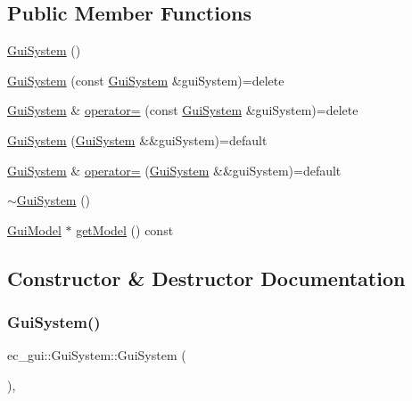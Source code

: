 \subsection*{Public Member Functions}
\begin{DoxyCompactItemize}
\item 
\mbox{\hyperlink{classec__gui_1_1_gui_system_a262982ada03e0085a9932279cf1da678}{Gui\+System}} ()
\item 
\mbox{\hyperlink{classec__gui_1_1_gui_system_aa7b5ff21faa1f3d2d1028e989a0ae937}{Gui\+System}} (const \mbox{\hyperlink{classec__gui_1_1_gui_system}{Gui\+System}} \&gui\+System)=delete
\item 
\mbox{\hyperlink{classec__gui_1_1_gui_system}{Gui\+System}} \& \mbox{\hyperlink{classec__gui_1_1_gui_system_a2ffbc153d2f83db5d6433f148ea69682}{operator=}} (const \mbox{\hyperlink{classec__gui_1_1_gui_system}{Gui\+System}} \&gui\+System)=delete
\item 
\mbox{\hyperlink{classec__gui_1_1_gui_system_aa2d8be80a1eeebb711a25e74840560ef}{Gui\+System}} (\mbox{\hyperlink{classec__gui_1_1_gui_system}{Gui\+System}} \&\&gui\+System)=default
\item 
\mbox{\hyperlink{classec__gui_1_1_gui_system}{Gui\+System}} \& \mbox{\hyperlink{classec__gui_1_1_gui_system_a87323faa2aaad5b224bf4981c9e90101}{operator=}} (\mbox{\hyperlink{classec__gui_1_1_gui_system}{Gui\+System}} \&\&gui\+System)=default
\item 
\mbox{\hyperlink{classec__gui_1_1_gui_system_a4c51936c9a64d27056e6e2756fb3ba54}{$\sim$\+Gui\+System}} ()
\item 
\mbox{\hyperlink{classec__gui_1_1_gui_model}{Gui\+Model}} $\ast$ \mbox{\hyperlink{classec__gui_1_1_gui_system_aacb878afa895f4e70a146bd73f712145}{get\+Model}} () const
\end{DoxyCompactItemize}


\subsection{Constructor \& Destructor Documentation}
\mbox{\label{classec__gui_1_1_gui_system_a262982ada03e0085a9932279cf1da678}} 
\subsubsection{\texorpdfstring{Gui\+System()}{GuiSystem()}\hspace{0.1cm}{\footnotesize\ttfamily [1/3]}}
{\footnotesize\ttfamily ec\+\_\+gui\+::\+Gui\+System\+::\+Gui\+System (\begin{DoxyParamCaption}{ }\end{DoxyParamCaption})\hspace{0.3cm}{\ttfamily [explicit]}, {\ttfamily [default]}}

